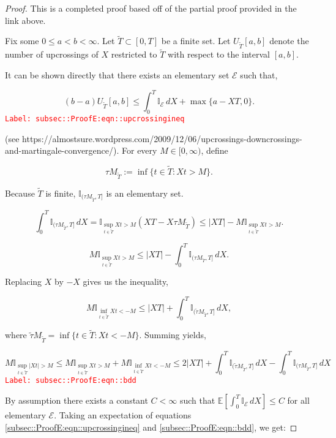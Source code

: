 \documentclass[12pt]{article}
\newcommand{\mb}{\mathbb}
\newcommand{\mc}{\mathcal}
\newcommand{\tr}{\textcolor{red}}
\newcommand{\labe}[1]{\tr{\texttt{Label: #1}}}
\newcommand{\ind}{\hspace{24pt}}
\newcommand{\ex}[1]{\mb{E}\left[#1\right]}			%
\newcommand{\T}{T}								%
\renewcommand{\t}{t}							%
\newcommand{\X}{X}								%
\newcommand{\const}{C}							%
\newcommand{\alt}[1]{\widetilde{#1}}			%
\newcommand{\rt}{\tau}							%
\newcommand{\evnt}{\mc{E}}						%
\newcommand{\Tset}{\alt{T}}						%
\begin{document}
\begin{proof}
This is a completed proof based off of the partial proof provided in the link above.

\ind Fix some \(0\leq a < b < \infty\). Let \(\Tset \subset [0,\T]\) be a finite set. Let \(U_{\alt{\T}}[a,b]\) denote the number of upcrossings of \(\X{}{}\) restricted to \(\alt{\T}\) with respect to the interval \([a,b]\).

\ind It can be shown directly that there exists an elementary set \(\evnt\) such that,

\begin{equation}
(b-a)U_{\Tset}[a,b] \leq \int_0^\T \mb{I}_{\evnt}\,d\X{}{} + \max\{a - \X{}{\T},0\}.
\label{subsec::ProofE:eqn::upcrossingineq}
\end{equation}
\labe{subsec::ProofE:eqn::upcrossingineq}

(see https://almostsure.wordpress.com/2009/12/06/upcrossings-downcrossings-and-martingale-convergence/). For every \(M \in [0,\infty)\), define

\[\rt{M}_{\Tset} := \inf\{\t\in \alt{\T}: \X{}{\t} > M\}.\]

Because \(\Tset\) is finite, \(\mb{I}_{(\rt{M}_{\Tset},\T]}\) is an elementary set.

\[\int_0^\T \mb{I}_{(\rt{M}_{\Tset},\T]}\,d\X{}{} = \mb{I}_{\sup_{\t\in \Tset} \X{}{\t} > M}(\X{}{\T} - \X{}{\rt{M}_{\Tset}}) \leq |\X{}{\T}| - M\mb{I}_{\sup_{\t \in \Tset} \X{}{\t} > M}.\]

\[M\mb{I}_{\sup_{\t\in\Tset} \X{}{\t} > M} \leq |\X{}{\T}| - \int_0^T \mb{I}_{(\rt{M}_{\Tset},\T]}\,d\X{}{}.\]


Replacing \(\X{}{}\) by \(-\X{}{}\) gives us the inequality,

\[M\mb{I}_{\inf_{\t\in\Tset} \X{}{\t} < -M} \leq |\X{}{\T}| + \int_0^T \mb{I}_{(\alt{\rt}{M}_{\Tset},\T]}\,d\X{}{},\]

where \(\alt{\rt}{M}_{\Tset} = \inf\{\t\in \Tset: \X{}{\t} < -M\}\). Summing yields,

\begin{equation}
M\mb{I}_{\sup_{\t\in\Tset}|\X{}{\t}| > M} \leq M\mb{I}_{\sup_{\t\in\Tset}\X{}{\t} > M} + M\mb{I}_{\inf_{\t\in\Tset}\X{}{\t} < -M} \leq 2|\X{}{\T}| + \int_0^\T \mb{I}_{(\alt{\rt}{M}_{\Tset},\T]}\,d\X{}{} - \int_0^\T \mb{I}_{(\rt{M}_{\Tset},\T]}\,d\X{}{}
\label{subsec::ProofE:eqn::bdd}
\end{equation}
\labe{subsec::ProofE:eqn::bdd}

By assumption there exists a constant \(\const{} < \infty\) such that \(\ex{\int_0^\T \mb{I}_{\evnt}\,d\X{}{}} \leq \const{}\) for all elementary \(\evnt\). Taking an expectation of equations \eqref{subsec::ProofE:eqn::upcrossingineq} and \eqref{subsec::ProofE:eqn::bdd}, we get:


\end{proof}
\end{document}
